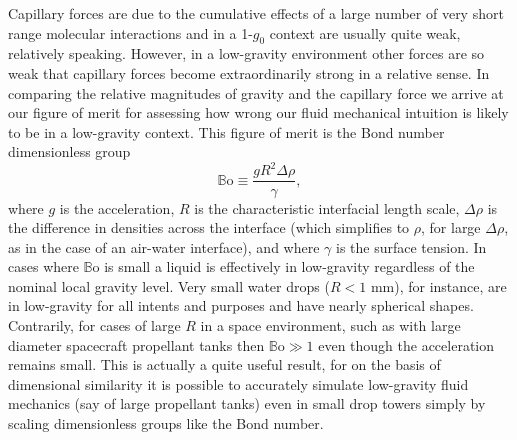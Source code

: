 \documentclass[12pt,a4paper,oneside]{book}
\begin{document}
Capillary forces are due to the cumulative effects of a large number of very short range molecular interactions and in a 1-$g_0$ context are usually quite weak, relatively speaking. However, in a low-gravity environment other forces are so weak that capillary forces become extraordinarily strong in a relative sense. In comparing the relative magnitudes of gravity and the capillary force we arrive at our figure of merit for assessing how wrong our fluid mechanical intuition is likely to be in a low-gravity context. This figure of merit is the Bond number dimensionless group
\[ \mathbb{B}\mbox{o} \equiv \frac{g R^2 \Delta \rho}{\gamma}, 
\]
where $g$ is the acceleration, $R$ is the characteristic interfacial length scale, $\Delta \rho$ is the difference in densities across the interface (which simplifies to $\rho$, for large $\Delta \rho$, as in the case of an air-water interface), and where $\gamma$ is the surface tension. In cases where $\mathbb{B}\mbox{o}$ is small a liquid is effectively in low-gravity regardless of the nominal local gravity level. Very small water drops ($R < 1$ mm), for instance, are in low-gravity for all intents and purposes and have nearly spherical shapes. Contrarily, for cases of large $R$ in a space environment, such as with large diameter spacecraft propellant tanks then $ \mathbb{B}\mbox{o} \gg 1$ even though the acceleration remains small. This is actually a quite useful result, for on the basis of dimensional similarity it is possible to accurately simulate low-gravity fluid mechanics (say of large propellant tanks) even in small drop towers simply by scaling dimensionless groups like the Bond number. 
\end{document}

